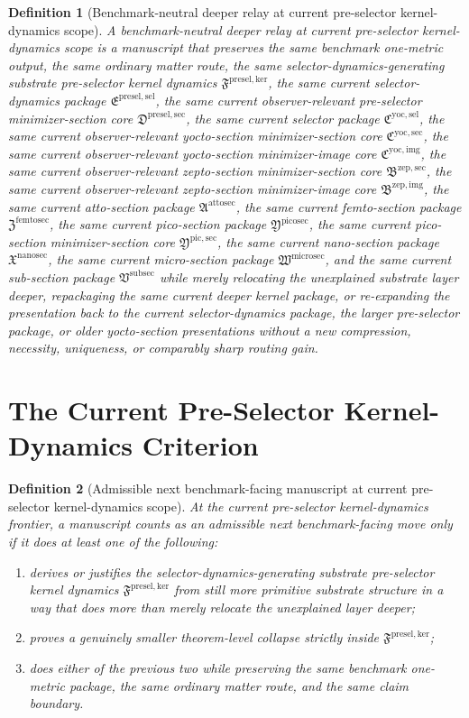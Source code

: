 \documentclass[11pt]{article}
\newcommand{\KernelPackage}{\mathfrak F^{\mathrm{presel,ker}}}
\newcommand{\PreSectionSelectorPackage}{\mathfrak E^{\mathrm{presel,sel}}}
\newcommand{\PreSelectorMinSectionCore}{\mathfrak D^{\mathrm{presel,sec}}}
\newcommand{\YoctoSelectorPackage}{\mathfrak C^{\mathrm{yoc,sel}}}
\newcommand{\YoctoImageCore}{\mathfrak C^{\mathrm{yoc,img}}}
\newcommand{\YoctoMinSectionCore}{\mathfrak C^{\mathrm{yoc,sec}}}
\newcommand{\ZeptoImageCore}{\mathfrak B^{\mathrm{zep,img}}}
\newcommand{\ZeptoMinSectionCore}{\mathfrak B^{\mathrm{zep,sec}}}
\newcommand{\AttoSectionPackage}{\mathfrak A^{\mathrm{attosec}}}
\newcommand{\FemtoSectionPackage}{\mathfrak Z^{\mathrm{femtosec}}}
\newcommand{\PicoSectionPackage}{\mathfrak Y^{\mathrm{picosec}}}
\newcommand{\PicoMinSectionCore}{\mathfrak Y^{\mathrm{pic,sec}}}
\newcommand{\NanoSectionPackage}{\mathfrak X^{\mathrm{nanosec}}}
\newcommand{\MicroSectionPackage}{\mathfrak W^{\mathrm{microsec}}}
\newcommand{\SubSectionPackage}{\mathfrak V^{\mathrm{subsec}}}
\newtheorem{definition}{Definition}
\begin{document}
\begin{definition}[Benchmark-neutral deeper relay at current pre-selector kernel-dynamics scope]
A \emph{benchmark-neutral deeper relay at current pre-selector kernel-dynamics scope} is a manuscript that preserves the same benchmark one-metric output, the same ordinary matter route, the same selector-dynamics-generating substrate pre-selector kernel dynamics \(\KernelPackage\), the same current selector-dynamics package \(\PreSectionSelectorPackage\), the same current observer-relevant pre-selector minimizer-section core \(\PreSelectorMinSectionCore\), the same current selector package \(\YoctoSelectorPackage\), the same current observer-relevant yocto-section minimizer-section core \(\YoctoMinSectionCore\), the same current observer-relevant yocto-section minimizer-image core \(\YoctoImageCore\), the same current observer-relevant zepto-section minimizer-section core \(\ZeptoMinSectionCore\), the same current observer-relevant zepto-section minimizer-image core \(\ZeptoImageCore\), the same current atto-section package \(\AttoSectionPackage\), the same current femto-section package \(\FemtoSectionPackage\), the same current pico-section package \(\PicoSectionPackage\), the same current pico-section minimizer-section core \(\PicoMinSectionCore\), the same current nano-section package \(\NanoSectionPackage\), the same current micro-section package \(\MicroSectionPackage\), and the same current sub-section package \(\SubSectionPackage\) while merely relocating the unexplained substrate layer deeper, repackaging the same current deeper kernel package, or re-expanding the presentation back to the current selector-dynamics package, the larger pre-selector package, or older yocto-section presentations without a new compression, necessity, uniqueness, or comparably sharp routing gain.
\end{definition}

\section{The Current Pre-Selector Kernel-Dynamics Criterion}

\begin{definition}[Admissible next benchmark-facing manuscript at current pre-selector kernel-dynamics scope]
At the current pre-selector kernel-dynamics frontier, a manuscript counts as an admissible next benchmark-facing move only if it does at least one of the following:
\begin{enumerate}
    \item derives or justifies the selector-dynamics-generating substrate pre-selector kernel dynamics \(\KernelPackage\) from still more primitive substrate structure in a way that does more than merely relocate the unexplained layer deeper;
    \item proves a genuinely smaller theorem-level collapse strictly inside \(\KernelPackage\);
    \item does either of the previous two while preserving the same benchmark one-metric package, the same ordinary matter route, and the same claim boundary.
\end{enumerate}
\end{definition}
\end{document}
